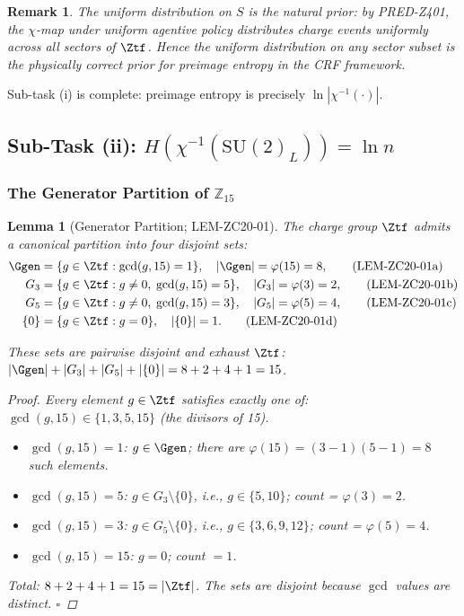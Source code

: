 \documentclass[12pt, a4paper]{article}
\newtheorem{lemma}{Lemma}[section]
\newtheorem{remark}{Remark}[section]
\begin{document}
\begin{remark}
The uniform distribution on $S$ is the natural prior: by
PRED-Z401, the $\chi$-map under uniform agentive policy distributes
charge events uniformly across all sectors of $\Ztf$.
Hence the uniform distribution on any sector subset is the
physically correct prior for preimage entropy in the
CRF framework.
\end{remark}

Sub-task (i) is complete: preimage entropy is precisely
$\ln|\chi^{-1}(\cdot)|$.

\subsection{Sub-Task (ii): $H(\chi^{-1}(\mathrm{SU}(2)_L)) = \ln n$}
\label{zc20:sec:su2}

\subsubsection{The Generator Partition of $\mathbb{Z}_{15}$}

\begin{lemma}[Generator Partition; LEM-ZC20-01]
\label{zc20:lem:partition}
The charge group $\Ztf$ admits a canonical partition into four
disjoint sets:
\begin{align}
  \Ggen &= \{g \in \Ztf : \gcd(g, 15) = 1\},
    \quad |\Ggen| = \varphi(15) = 8,
    \tag{LEM-ZC20-01a}\\
  G_3 &= \{g \in \Ztf : g \neq 0,\; \gcd(g, 15) = 5\},
    \quad |G_3| = \varphi(3) = 2,
    \tag{LEM-ZC20-01b}\\
  G_5 &= \{g \in \Ztf : g \neq 0,\; \gcd(g, 15) = 3\},
    \quad |G_5| = \varphi(5) = 4,
    \tag{LEM-ZC20-01c}\\
  \{0\} &= \{g \in \Ztf : g = 0\},
    \quad |\{0\}| = 1.
    \tag{LEM-ZC20-01d}
\end{align}

These sets are pairwise disjoint and exhaust $\Ztf$:
$|\Ggen| + |G_3| + |G_5| + |\{0\}| = 8 + 2 + 4 + 1 = 15$.

\begin{proof}
Every element $g \in \Ztf$ satisfies exactly one of:
$\gcd(g, 15) \in \{1, 3, 5, 15\}$ (the divisors of 15).
\begin{itemize}[leftmargin=*, noitemsep]
  \item $\gcd(g,15)=1$: $g \in \Ggen$; there are $\varphi(15) = (3-1)(5-1) = 8$ such elements.
  \item $\gcd(g,15)=5$: $g \in G_3 \setminus \{0\}$, i.e., $g \in \{5, 10\}$;
    count = $\varphi(3) = 2$.
  \item $\gcd(g,15)=3$: $g \in G_5 \setminus \{0\}$, i.e., $g \in \{3,6,9,12\}$;
    count = $\varphi(5) = 4$.
  \item $\gcd(g,15)=15$: $g = 0$; count $= 1$.
\end{itemize}
Total: $8 + 2 + 4 + 1 = 15 = |\Ztf|$.
The sets are disjoint because $\gcd$ values are distinct.
\hfill$\square$
\end{proof}
\end{lemma}
\end{document}
